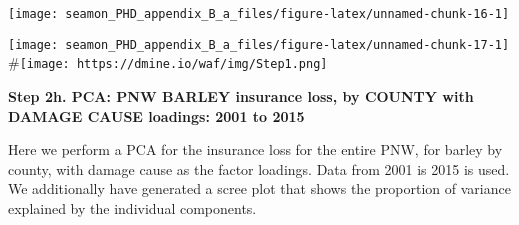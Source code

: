 \documentclass[]{article}
\newenvironment{Shaded}{\begin{snugshade}}{\end{snugshade}}
\newcommand{\CommentTok}[1]{\textcolor[rgb]{0.56,0.35,0.01}{\textit{#1}}}
\newcommand{\DataTypeTok}[1]{\textcolor[rgb]{0.13,0.29,0.53}{#1}}
\newcommand{\DecValTok}[1]{\textcolor[rgb]{0.00,0.00,0.81}{#1}}
\newcommand{\KeywordTok}[1]{\textcolor[rgb]{0.13,0.29,0.53}{\textbf{#1}}}
\newcommand{\NormalTok}[1]{#1}
\newcommand{\OperatorTok}[1]{\textcolor[rgb]{0.81,0.36,0.00}{\textbf{#1}}}
\newcommand{\StringTok}[1]{\textcolor[rgb]{0.31,0.60,0.02}{#1}}
\begin{document}
\texttt{[image: seamon\_PHD\_appendix\_B\_a\_files/figure-latex/unnamed-chunk-16-1]}

\begin{Shaded}
\end{Shaded}

\texttt{[image: seamon\_PHD\_appendix\_B\_a\_files/figure-latex/unnamed-chunk-17-1]}
\#\texttt{[image: https://dmine.io/waf/img/Step1.png]}

\textbf{Step 2h. PCA: PNW BARLEY insurance loss, by COUNTY with DAMAGE
CAUSE loadings: 2001 to 2015}

Here we perform a PCA for the insurance loss for the entire PNW, for
barley by county, with damage cause as the factor loadings. Data from
2001 is 2015 is used. We additionally have generated a scree plot that
shows the proportion of variance explained by the individual components.
\end{document}
